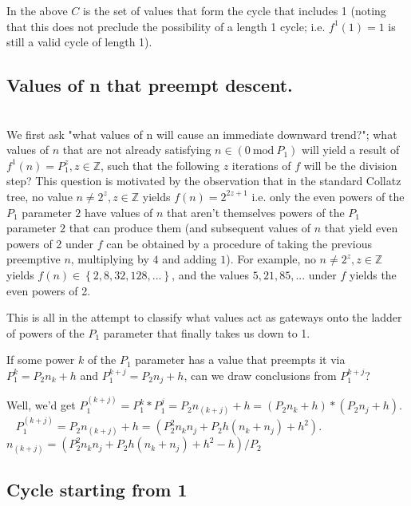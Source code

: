 \documentclass[12pt,a4paper]{amsart}
\numberwithin{equation}{section}
\theoremstyle{plain}
\theoremstyle{definition}
\begin{document}
In the above $C$ is the set of values that form the cycle that includes 1 (noting that this does not preclude the possibility of a length 1 cycle; i.e. $f^{1} \left  ( 1 \right ) = 1$ is still a valid cycle of length 1).

\subsection{Values of n that preempt descent.} \hfill\\

We first ask "what values of n will cause an immediate downward trend?"; what values of $n$ that are not already satisfying $n \in \left ( 0\:\mathrm{mod}\:P_{1} \right )$ will yield a result of $f^{1} \left ( n \right ) = P^{z}_{1}, z \in \mathbb{Z}$, such that the following $z$ iterations of $f$ will be the division step? This question is motivated by the observation that in the standard Collatz tree, no value $n \neq 2^{z}, z \in \mathbb{Z}$ yields $f \left ( n \right ) = 2^{2z+1}$ i.e. only the even powers of the $P_1$ parameter $2$ have values of $n$ that aren't themselves powers of the $P_1$ parameter $2$ that can produce them (and subsequent values of $n$ that yield even powers of 2 under $f$ can be obtained by a procedure of taking the previous preemptive $n$, multiplying by $4$ and adding $1$). For example, no $n \neq 2^{z}, z \in \mathbb{Z}$ yields $f \left ( n \right ) \in \left \{ 2, 8, 32, 128, ... \right \}$, and the values $5, 21, 85, ...$ under $f$ yields the even powers of 2.

This is all in the attempt to classify what values act as gateways onto the ladder of powers of the $P_1$ parameter that finally takes us down to 1.

If some power $k$ of the $P_1$ parameter has a value that preempts it via $P^{k}_{1} = P_{2}n_{k} + h$ and $P^{k+j}_{1} = P_{2}n_{j} + h$, can we draw conclusions from $P^{k+j}_{1}$?

Well, we'd get $P^{\left ( k+j \right )}_{1} = P^{k}_{1}*P^{j}_{1} = P_{2}n_{\left ( k+j \right )} + h = \left ( P_{2}n_{k} + h \right )*\left ( P_{2}n_{j} + h \right )$.
~ $P^{\left ( k+j \right )}_{1} = P_{2}n_{\left ( k+j \right )} + h = \left ( P^{2}_{2}n_{k}n_{j} + P_{2}h\left ( n_{k} + n_{j} \right ) + h^{2} \right )$.
~ $n_{\left ( k+j \right )} = \left ( P^{2}_{2}n_{k}n_{j} + P_{2}h\left ( n_{k} + n_{j} \right ) + h^{2} - h \right ) / P_{2}$

\subsection{Cycle starting from 1} \hfill\\
\end{document}
